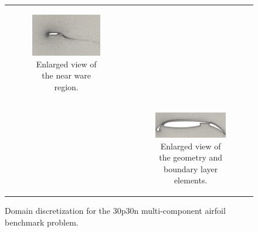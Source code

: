 \documentclass[12pt,portrait]{article}
\begin{document}
\begin{figure}[ht]
\begin{tabular}{cc}
\begin{subfigure}[!ht]{0.5\textwidth}
  \includegraphics[width=0.99\columnwidth]{../images/30p30n_zoom1.png}
  \caption{Enlarged view of the near ware region.}
  \label{fig:30p30n_zoom1}
  \end{subfigure}%
  \\
  &
  \begin{subfigure}[!hb]{0.5\textwidth}
        \centering
  \includegraphics[width=0.99\columnwidth]{../images/30p30n_zoom2.png}
  \caption{Enlarged view of the geometry and boundary layer elements.}
  \label{fig:30p30n_zoom2}
  \end{subfigure}%
  \\
  \end{tabular}
  \caption{Domain discretization for the 30p30n multi-component airfoil benchmark problem.}
  \label{fig:30p30n_domain}
\end{figure}
\end{document}
